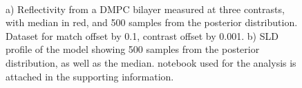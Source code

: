 \documentclass[12pt]{article}
\begin{document}
\begin{figure}%
\centering
{}\hspace{1em}%
\\%
\caption{a) Reflectivity from a DMPC bilayer measured at three contrasts, with median in red, and 500 samples from the posterior distribution. Dataset for  match offset by 0.1,  contrast offset by 0.001. b) SLD profile of the  model showing 500 samples from the posterior distribution, as well as the median. \Jupyter notebook used for the analysis is attached in the supporting information.}
\end{figure}
\end{document}
